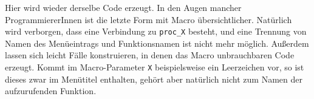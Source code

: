 Hier wird wieder derselbe Code erzeugt. In den Augen mancher ProgrammiererInnen ist die letzte Form mit Macro übersichtlicher. Natürlich wird verborgen, dass eine Verbindung zu \texttt{proc\_X} besteht, und eine Trennung von Namen des Menüeintrags und Funktionsnamen ist nicht mehr möglich. Außerdem lassen sich leicht Fälle konstruieren, in denen das Macro unbrauchbaren Code erzeugt. Kommt im Macro-Parameter \texttt{X} beispielsweise ein Leerzeichen vor, so ist dieses zwar im Menütitel enthalten, gehört aber natürlich nicht zum Namen der aufzurufenden Funktion.